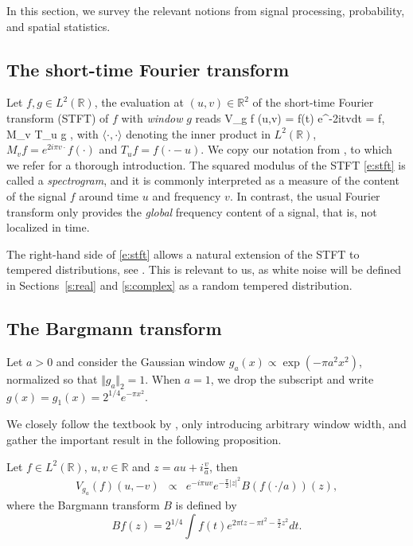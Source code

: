 In this section, we survey the relevant notions
from signal processing, probability, and spatial statistics. 

\subsection{The short-time Fourier transform}
\label{s:stft}
Let $f,g\in L^2(\mathbb{R})$, the evaluation at $(u,v)\in\mathbb{R}^2$ of the
short-time Fourier transform (STFT) of $f$ with \emph{window} $g$ reads
\beq
 V_g f (u,v) = \int f(t)  e^{-2i\pi tv}dt = \langle f, M_v T_u g \rangle,
\label{e:stft}
\eeq
with $\langle \cdot,\cdot\rangle$ denoting the inner product in
$L^2(\mathbb{R})$, $M_vf =
e^{2i\pi v\cdot}f(\cdot)$ and $T_uf = f(\cdot-u)$. We copy our notation from \citep[Chapter 3]{Gro01}, to which
we refer for a thorough introduction. The squared modulus of the STFT
\eqref{e:stft} is called a
\emph{spectrogram}, and it is commonly interpreted as a measure of the
content of the signal $f$ around time $u$ and frequency $v$. In contrast, the
usual Fourier transform only provides the \emph{global} frequency content of
a signal, that is, not localized in time.

The right-hand side of \eqref{e:stft} allows a natural extension of the STFT to
tempered distributions, see \citep[Section 3.1]{Gro01}. This is relevant to us,
as white noise will be defined in Sections~\ref{s:real} and \ref{s:complex} as a random tempered
distribution.

\subsection{The Bargmann transform}
\label{s:bargmann}

Let $a>0$ and consider the Gaussian window $g_a(x) \propto \exp(-\pi a^2 x^2)$, normalized so
that $\Vert g_a\Vert_2=1$. When $a=1$, we drop the subscript and write $g(x) = g_1(x) = 2^{1/4}e^{-\pi x^2}$.

We closely follow the textbook by \cite{Gro01}, only introducing arbitrary window
width, and gather the important result in the following proposition.
\begin{prop}{\cite[Section 3.4]{Gro01}}
Let $f\in L^2(\mathbb{R})$, $u,v\in\mathbb{R}$ and $z=au+i\frac{v}{a}$, then
\begin{eqnarray}
V_{g_a}(f)(u,-v) &\propto&  e^{-i\pi uv}e^{-\frac{\pi}{2}\vert z\vert^2} B\left( f(\cdot/a)
          \right)(z),\label{e:bargmann}
\end{eqnarray}
where the Bargmann transform $B$ is defined by
$$
Bf(z) = 2^{1/4}\int f(t)e^{2\pi tz-\pi t^2-\frac{\pi}{2}z^2}dt.
$$
\end{prop}

